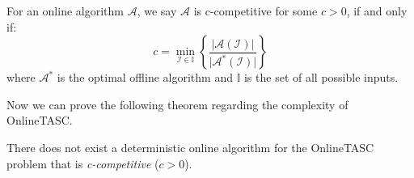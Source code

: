 \begin{definition} 
For an online algorithm $\mathcal{A}$, we say $\mathcal{A}$ is c-competitive for some $c > 0$, if and only if:
\begin{equation*}
c = \min\limits_{\mathcal{I} \in \mathbb{I}} \left\lbrace \frac{\vert \mathcal{A}\left( \mathcal{I} \right) \vert}{\vert \mathcal{A}^{*} \left( \mathcal{I} \right) \vert} \right\rbrace
\end{equation*}
where $\mathcal{A}^{*}$ is the optimal offline algorithm and $\mathbb{I}$ is the set of all possible inputs.
\end{definition}

Now we can prove the following theorem regarding the complexity of OnlineTASC.

\begin{theorem}
\label{th:comp_ratio}
There does not exist a deterministic online algorithm for the OnlineTASC problem that is \textit{c-competitive} ($c > 0$). 
\end{theorem}

